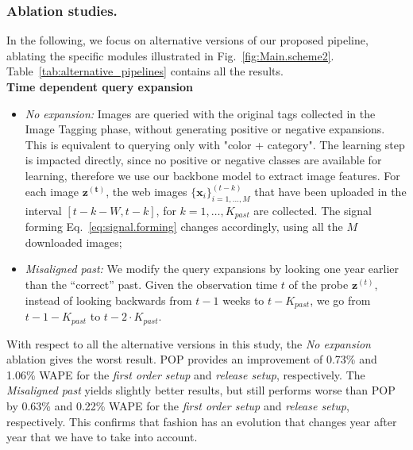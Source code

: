 \documentclass[runningheads]{llncs}
\newcommand{\snamebig}[0] {POP\xspace}
\begin{document}
\subsubsection{Ablation studies.}\label{sec:alternative}
In the following, we focus on alternative versions of our proposed pipeline, ablating the specific modules illustrated in Fig.~\ref{fig:Main.scheme2}.
Table~\ref{tab:alternative_pipelines} contains all the results.\\
\noindent\textbf{Time dependent query expansion}
\begin{itemize} [noitemsep, leftmargin=*]
    \item{\emph{No expansion:}} Images are queried with the original tags collected in the Image Tagging phase, without generating positive or negative expansions. This is equivalent to querying only with "color + category". The learning step is impacted directly, since no positive or negative classes are available for learning, therefore we use our backbone model to extract image features. For each image $\mathbf{z^{(t)}}$, the web images $\{\mathbf{x}_i\}_{i=1,\ldots, M}^{(t-k)}$ that have been uploaded in the interval $[t-k-W,t-k]$, for $k=1,\ldots,K_{past}$ are collected. The signal forming Eq.~\ref{eq:signal.forming} changes accordingly, using all the $M$ downloaded images;
    \item{\emph{Misaligned past:}} We modify the query expansions by looking one year earlier than the ``correct'' past. Given the observation time $t$ of the probe $\mathbf{z}^{(t)}$, instead of looking backwards from $t-1$ weeks to $t-K_{past}$, we go from $t-1-K_{past}$ to $t-2\cdot K_{past}$.
    \vspace{-0.1cm}
\end{itemize}
With respect to all the alternative versions in this study, the \emph{No expansion} ablation gives the worst result. \snamebig provides an improvement of 0.73\% and 1.06\% WAPE for the \emph{first order setup} and \emph{release setup}, respectively.   
The \emph{Misaligned past} yields slightly better results, but still performs worse than \snamebig by 0.63\% and 0.22\% WAPE for the \emph{first order setup} and \emph{release setup}, respectively. This confirms that fashion has an evolution that changes year after year that we have to take into account.
\end{document}
